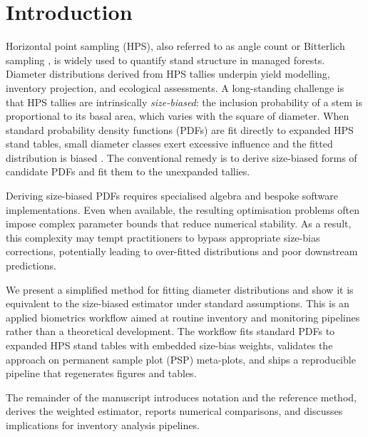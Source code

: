 \section{Introduction}

Horizontal point sampling (HPS), also referred to as angle count or Bitterlich
sampling \citep{bitterlich1947}, is widely used to quantify stand structure in
managed forests. Diameter distributions derived from HPS tallies underpin yield
modelling, inventory projection, and ecological assessments. A long-standing
challenge is that HPS tallies are intrinsically \emph{size-biased}: the
inclusion probability of a stem is proportional to its basal area, which varies
with the square of diameter. When standard probability density functions (PDFs)
are fit directly to expanded HPS stand tables, small diameter classes exert
excessive influence and the fitted distribution is biased \citep{van1986,
gove2000, ducey2015}. The conventional remedy is to derive size-biased forms of
candidate PDFs and fit them to the unexpanded tallies.

Deriving size-biased PDFs requires specialised algebra and bespoke software
implementations. Even when available, the resulting optimisation problems
often impose complex parameter bounds that reduce numerical stability. As a
result, this complexity may tempt practitioners to bypass appropriate size-bias
corrections, potentially leading to over-fitted distributions and poor downstream
predictions.

We present a simplified method for fitting diameter distributions and show
it is equivalent to the size-biased estimator under standard assumptions. This is an applied biometrics
workflow aimed at routine inventory and monitoring pipelines rather than a
theoretical development. The workflow fits standard PDFs to expanded HPS
stand tables with embedded size-bias weights, validates the approach on
permanent sample plot (PSP) meta-plots, and ships a reproducible pipeline
that regenerates figures and tables.

The remainder of the manuscript introduces notation and the reference method,
derives the weighted estimator, reports numerical comparisons, and discusses
implications for inventory analysis pipelines.
